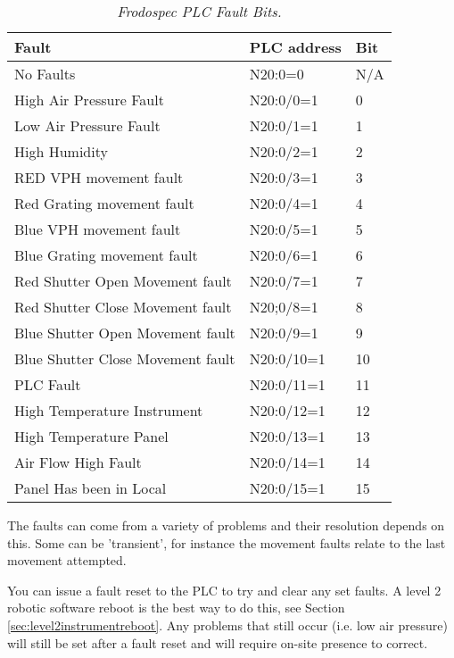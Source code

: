 \documentclass[10pt,a4paper]{article}
\begin{document}
\begin{table}[!h]
\begin{center}
\begin{tabular}{|l|l|p{15em}|}
\hline
{\bf Fault} & {\bf PLC address} & {\bf Bit} \\ \hline
No Faults	                        & N20:0=0    & N/A \\ 
High Air Pressure Fault		        & N20:0/0=1  & 0  \\
Low Air Pressure Fault			& N20:0/1=1  & 1  \\
High Humidity				& N20:0/2=1  & 2  \\
RED VPH movement fault			& N20:0/3=1  & 3  \\
Red Grating movement fault		& N20:0/4=1  & 4  \\
Blue VPH movement fault			& N20:0/5=1  & 5  \\
Blue Grating movement fault		& N20:0/6=1  & 6  \\
Red Shutter Open Movement fault		& N20:0/7=1  & 7  \\
Red Shutter Close Movement fault	& N20;0/8=1  & 8  \\
Blue Shutter Open Movement fault	& N20:0/9=1  & 9  \\
Blue Shutter Close Movement fault	& N20:0/10=1 & 10 \\
PLC Fault				& N20:0/11=1 & 11 \\
High Temperature Instrument		& N20:0/12=1 & 12 \\
High Temperature Panel			& N20:0/13=1 & 13 \\
Air Flow High Fault			& N20:0/14=1 & 14 \\
Panel Has been in Local			& N20:0/15=1 & 15 \\ \hline
\end{tabular}
\end{center}
\caption{\em Frodospec PLC Fault Bits.}
\label{tab:frodospecplcfaultbits}
\end{table}

The faults can come from a variety of problems and their resolution depends on this. Some can be 'transient',
for instance the movement faults relate to the last movement attempted.

You can issue a fault reset to the PLC to try and clear any set faults. A level 2 robotic software reboot is the best
way to do this, see  Section \ref{sec:level2instrumentreboot}. Any problems that still occur (i.e. low air pressure)
will still be set after a fault reset and will require on-site presence to correct.
\end{document}
